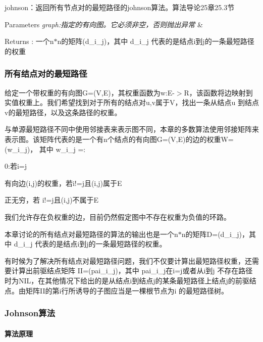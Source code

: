 johnson：返回所有节点对的最短路径的johnson算法。算法导论25章25.3节 


\begin{DoxyParams}{Parameters}
{\em graph\+:指定的有向图。它必须非空，否则抛出异常} & \\
\hline
\end{DoxyParams}
\begin{DoxyReturn}{Returns}
\+: 一个n$\ast$n的矩阵(d\+\_\+i\+\_\+j)，其中 d\+\_\+i\+\_\+j 代表的是结点i到j的一条最短路径的权重
\end{DoxyReturn}
\subsubsection*{所有结点对的最短路径}

给定一个带权重的有向图\+G=(V,E)，其权重函数为w\+:E-\/$>$R，该函数将边映射到实值权重上。我们希望找到对于所有的结点对u,v属于\+V，找出一条从结点u 到结点v的最短路径，以及这条路径的权重。

与单源最短路径不同中使用邻接表来表示图不同，本章的多数算法使用邻接矩阵来表示图。该矩阵代表的是一个有n个结点的有向图\+G=(V,E)的边的权重\+W=(w\+\_\+i\+\_\+j)， 其中 w\+\_\+i\+\_\+j =\+:


\begin{DoxyItemize}
\item 0\+:若i=j
\item 有向边(i,j)的权重，若i!=j且(i,j)属于\+E
\item 正无穷，若 i!=j且(i,j)不属于\+E
\end{DoxyItemize}

我们允许存在负权重的边，目前仍然假定图中不存在权重为负值的环路。

本章讨论的所有结点对最短路径的算法的输出也是一个n$\ast$n的矩阵\+D=(d\+\_\+i\+\_\+j)，其中 d\+\_\+i\+\_\+j 代表的是结点i到j的一条最短路径的权重。

有时候为了解决所有结点对最短路径问题，我们不仅要计算出最短路径权重，还需要计算出前驱结点矩阵 I\+I=(pai\+\_\+i\+\_\+j)，其中 pai\+\_\+i\+\_\+j在i=j或者从i到j 不存在路径时为\+N\+I\+L，在其他情况下给出的是从结点i到结点j的某条最短路径上结点j的前驱结点。由矩阵\+I\+I的第i行所诱导的子图应当是一棵根节点为i 的最短路径树。

\subsubsection*{Johnson算法}

\paragraph*{算法原理}

